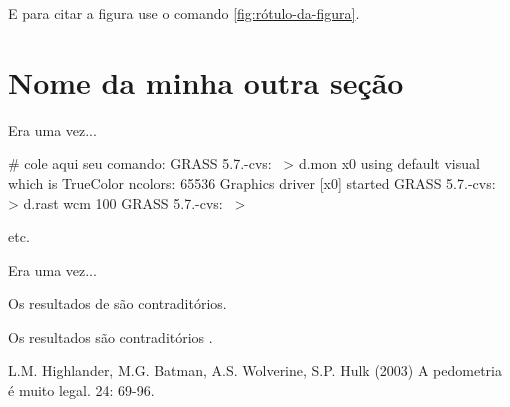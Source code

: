 E para citar a figura use o comando \ref{fig:rótulo-da-figura}.



\section{Nome da minha outra seção}
\label{sec:rótulo-da-minha-outra-seção}



Era uma vez...



\begin{smallverbatim}
# cole aqui seu comando:
GRASS 5.7.-cvs:~ > d.mon x0
using default visual which is TrueColor
ncolors: 65536
Graphics driver [x0] started
GRASS 5.7.-cvs:~ > d.rast wcm
 100%
GRASS 5.7.-cvs:~ >

etc. 
\end{smallverbatim}



Era uma vez...



Os resultados de \cite{highlander:2003} são contraditórios.



Os resultados são contraditórios \citep{highlander:2003}.



\begin{footnotesize}
\begin{thebibliography}{99}



L.M. Highlander, M.G. Batman, A.S. Wolverine, S.P. Hulk (2003)
\newblock A pedometria é muito legal.
 24: 69-96.





\end{thebibliography}
\end{footnotesize}



\address{Seu Nome\\
  Sua Organização\\
  \url{seu website}\\
  }




